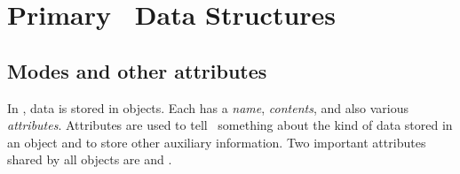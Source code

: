 %

\section{Primary \R\ Data Structures}
\label{sec:datastruct}

\subsection{Modes and other attributes} %
In \R, data is stored in objects.  Each  
has a \emph{name}, \emph{contents}, and also various \emph{attributes}.
Attributes are used to tell \R\ something about the kind
of data stored in an object and to store other auxiliary information.  
Two important attributes shared 
by all objects are  and .

%
%
%
%
\Rindex{[ ]}%

\begin{knitrout}
\end{knitrout}



